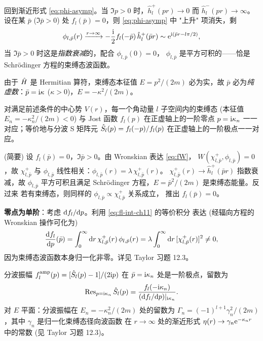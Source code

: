 回到渐近形式 \eqref{eq:phi-asymp}。当 $\Im p>0$ 时，$\hat h^+_l(pr)\to0$ 而
$\hat h^-_l(pr)\to\infty$。设在某 $\bar p$ ($\Im\bar p>0$) 处
$f_l(\bar p)=0$，则 \eqref{eq:phi-asymp} 中 "上升" 项消失，剩
\begin{equation}
\phi_{l,\bar p}(r)\xrightarrow{r\to\infty}
-\frac{\mathrm{i}}{2}f_l(-\bar p)\,\hat h^+_l(\bar p r)
\sim \mathrm{e}^{\mathrm{i}(\bar p r-l\pi/2)},
\end{equation}
当 $\Im\bar p>0$ 时这是\emph{指数衰减}的，配合 $\phi_{l,\bar p}(0)=0$，
$\phi_{l,\bar p}$ 是平方可积的——恰是 Schr\"odinger 方程的束缚态波函数。

由于 $\hat{H}$ 是 Hermitian 算符，束缚态本征值 $E=p^2/(2m)$ 必为实，故
$\bar p$ 必为\emph{纯虚数}：$\bar p=\mathrm{i}\kappa$ ($\kappa>0$)，$E=-\kappa^2/(2m)$。

\begin{theorem}\label{thm:bound-zero}
对满足前述条件的中心势 $V(r)$，每一个角动量 $l$ 子空间内的束缚态 (本征值
$E_n=-\kappa_n^2/(2m)<0$) 与 Jost 函数 $f_l(p)$ 在正虚轴上的一阶零点
$p=\mathrm{i}\kappa_n$ 一一对应；等价地与分波 S 矩阵元 $\hat{S}_l(p)=f_l(-p)/f_l(p)$
在正虚轴上的一阶极点一一对应。
\end{theorem}

\begin{proof*}\!(简要)
设 $f_l(\bar p)=0$，$\Im\bar p>0$。由 Wronskian 表达 \eqref{eq:fW}，
$W(\chi^+_{l,\bar p},\phi_{l,\bar p})=0$，故 $\chi^+_{l,\bar p}$ 与
$\phi_{l,\bar p}$ 线性相关：$\phi_{l,\bar p}(r)=\lambda\,\chi^+_{l,\bar p}(r)$。
$\chi^+_{l,\bar p}(r)\to\hat h^+_l(\bar p r)$ 指数衰减，故 $\phi_{l,\bar p}$
平方可积且满足 Schr\"odinger 方程，$E=\bar p^2/(2m)$ 是束缚态能量。反过来
若有束缚态，则同样的 $\phi_{l,\bar p}\propto\chi^+_{l,\bar p}$ 关系成立，
推出 $f_l(\bar p)=0$。

\textbf{零点为单阶}：考虑 $\mathrm{d} f_l/\mathrm{d} p$。利用 \eqref{eq:fl-int-ch11} 的等价积分
表达 (经辐向方程的 Wronskian 操作可化为)
\begin{equation}
\frac{\mathrm{d} f_l}{\mathrm{d} p}(\bar p)=\int_0^\infty \mathrm{d} r\,\chi^+_{l,\bar p}(r)\,\phi_{l,\bar p}(r)
=\lambda\int_0^\infty \mathrm{d} r\,[\chi^+_{l,\bar p}(r)]^2\neq 0,
\end{equation}
因为束缚态波函数本身归一化非零。详见 Taylor 习题 12.3。
\end{proof*}

\begin{remark}[分波振幅的留数]
分波振幅 $f_l^{\text{amp}}(p)=[\hat{S}_l(p)-1]/(2\mathrm{i} p)$ 在 $\bar p=\mathrm{i}\kappa_n$
处是一阶极点，留数为
\begin{equation}
\operatorname{Res}_{p=\mathrm{i}\kappa_n}\hat{S}_l(p) = \frac{f_l(-\mathrm{i}\kappa_n)}{(\mathrm{d} f_l/\mathrm{d} p)|_{\mathrm{i}\kappa_n}}.
\end{equation}
对 $E$ 平面：分波振幅在 $E_n=-\kappa_n^2/(2m)$ 处的留数为
$\Gamma_n=(-1)^{l+1}\gamma_n^2/(2m)$，其中 $\gamma_n$ 是归一化束缚态径向波函数
在 $r\to\infty$ 处的渐近形式 $\eta(r)\to\gamma_n\mathrm{e}^{-\kappa_n r}$ 中的常数
(见 Taylor 习题 12.3)。
\end{remark}

